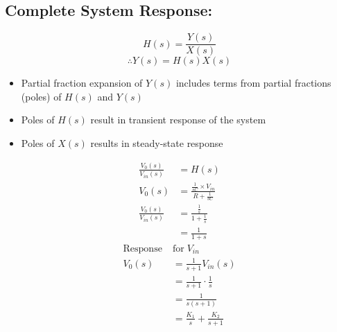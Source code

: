 \documentclass[a5paper]{article}
\begin{document}
	\subsection{Complete System Response:}
	$$H(s)=\frac{Y(s)}{X(s)}$$
	$$\therefore Y(s)=H(s)X(s)$$
	\begin{itemize}
		\item Partial fraction expansion of $Y(s)$ includes terms from partial fractions (poles) of $H(s)$ and $Y(s)$
		\item Poles of $H(s)$ result in transient response of the system
		\item Poles of $X(s)$ results in steady-state response
	\end{itemize}
	\begin{center}
	\end{center}
	\begin{align*}
		\frac{V_{0}(s)}{V_{in}(s)}&=H(s)\\
		V_{0}(s)&=\frac{\frac{1}{sC}\times V_{in}}{R+\frac{1}{sC}}\\
		\frac{V_{0}(s)}{V_{in}(s)}&=\frac{\frac{1}{s}}{1+\frac{1}{s}}\\
		&=\frac{1}{1+s}
	\end{align*}
	\begin{align*}
		\text{Response}\;&\text{for}\;V_{in}\\
		V_{0}(s)&=\frac{1}{s+1}V_{in}(s)\\
		&=\frac{1}{s+1}\cdot\frac{1}{s}\\
		&=\frac{1}{s(s+1)}\\
		&=\frac{K_{1}}{s}+\frac{K_{2}}{s+1}
	\end{align*}
\end{document}
